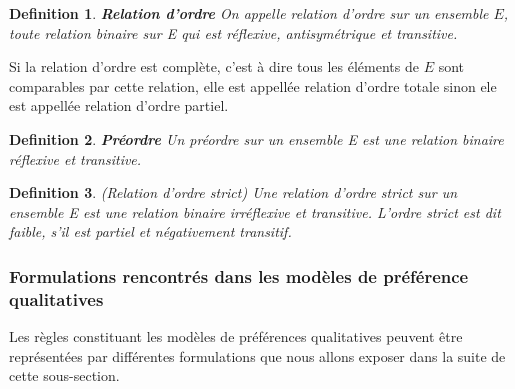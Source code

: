 \documentclass[a4paper,12pt,openany,oneside]{article}
\newtheorem{defn}{Definition} %
\begin{document}
\begin{defn}\textbf{Relation d'ordre}
        On appelle relation d'ordre sur un ensemble $E$, toute relation binaire sur E qui est réflexive, antisymétrique et transitive.
\end{defn}

Si la relation d’ordre est complète, c'est à dire tous les éléments de $E$ sont comparables par cette relation, elle est appellée relation d'ordre totale sinon ele est appellée relation d'ordre partiel.

\begin{defn}\textbf{Préordre}
Un préordre sur un ensemble E est une relation binaire réflexive et transitive.
\end{defn}

\begin{defn}(Relation d’ordre strict)
 Une relation d’ordre strict sur un ensemble E est une relation binaire irréflexive et transitive. L’ordre strict est dit faible, s’il est partiel et négativement transitif.
\end{defn}



\subsubsection{Formulations rencontrés dans les modèles de préférence qualitatives}

Les règles constituant les modèles de préférences qualitatives peuvent être représentées par différentes formulations que nous allons exposer dans la suite de cette sous-section.
\end{document}
